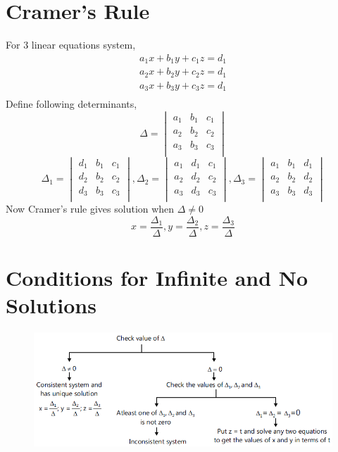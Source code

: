 \documentclass{article}
\begin{document}
\section{Cramer's Rule}
For 3 linear equations system,
\begin{align*}
    a_1x+b_1y+c_1z=d_1\\
    a_2x+b_2y+c_2z=d_1\\
    a_3x+b_3y+c_3z=d_1\\
\end{align*}
Define following determinants,
\begin{equation*}
    \Delta=
    \begin{vmatrix}
        a_1 & b_1 & c_1 \\
        a_2 & b_2 & c_2 \\
        a_3 & b_3 & c_3 \\
    \end{vmatrix}
\end{equation*}
\begin{equation*}
    \Delta_1=
    \begin{vmatrix}
        d_1 & b_1 & c_1 \\
        d_2 & b_2 & c_2 \\
        d_3 & b_3 & c_3 \\
    \end{vmatrix},
    \Delta_2=
    \begin{vmatrix}
        a_1 & d_1 & c_1 \\
        a_2 & d_2 & c_2 \\
        a_3 & d_3 & c_3 \\
    \end{vmatrix},
    \Delta_3=
    \begin{vmatrix}
        a_1 & b_1 & d_1 \\
        a_2 & b_2 & d_2 \\
        a_3 & b_3 & d_3 \\
    \end{vmatrix}
\end{equation*}
Now Cramer's rule gives solution when $\Delta \neq 0$
\begin{equation*}
    x=\frac{\Delta_1}{\Delta},y=\frac{\Delta_2}{\Delta},z=\frac{\Delta_3}{\Delta}
\end{equation*}
\section{Conditions for Infinite and No Solutions}
\begin{figure}[H]
    \centering
    \includegraphics[scale=0.5]{determinants_lec4_notes-2.png}
\end{figure}
\end{document}
